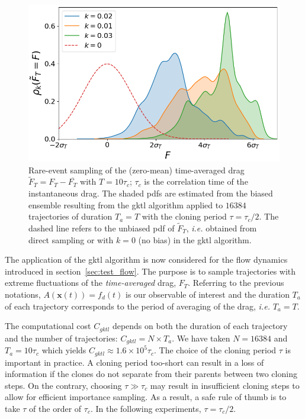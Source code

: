 \documentclass{jfm}
\begin{document}
\begin{figure}
	\centering
	\includegraphics[width=0.7\linewidth]{IS_GKTL/IS_GKTL}
	\caption{\label{fig:IS_GKTL} Rare-event sampling of the (zero-mean) time-averaged drag $\tilde F_T = F_T - \overline{F_T}$ with $T=10\tau_c$; $\tau_c$ is the correlation time of the instantaneous drag. The shaded \ac{pdf}s are estimated from the biased ensemble resulting from the \ac{gktl} algorithm applied to $16384$ trajectories of duration $T_a=T$ with the cloning period $\tau=\tau_c/2$.
	The dashed line refers to the unbiased \ac{pdf} of $\tilde F_T$, \textit{i.e.} obtained from direct sampling or with $k=0$ (no bias) in the \ac{gktl} algorithm.
}
\end{figure}

The application of the \ac{gktl} algorithm is now considered for the flow dynamics introduced in section~\ref{sec:test_flow}. The purpose is to sample trajectories with extreme fluctuations of the \textit{time-averaged} drag, $F_T$. {Referring to the previous notations, $A(\mathbf{x}(t))=f_d(t)$ is our observable of interest and the duration $T_a$ of each trajectory corresponds to the period of averaging of the drag, \emph{i.e.} $T_a=T$.}    

The computational cost $C_{{gktl}}$ depends on both the duration of each trajectory and the number of trajectories: $C_{gktl} = N \times T_a$.
We have taken $N=16384$ and $T_a = 10\tau_c$ which yields $C_{gktl} \approx 1.6 \times 10^5 \tau_c$. The choice of the cloning period $\tau$ is important in practice.
A  cloning period too-short can result in a loss of information if the clones do not separate from their parents between two cloning steps. On the contrary, choosing $\tau \gg \tau_c$ may result in insufficient cloning steps to allow for efficient importance sampling.
As a result, a safe rule of thumb is to take $\tau$ of the order of $\tau_c$.
In the following experiments, $\tau = \tau_c /2$. 
%
\end{document}
